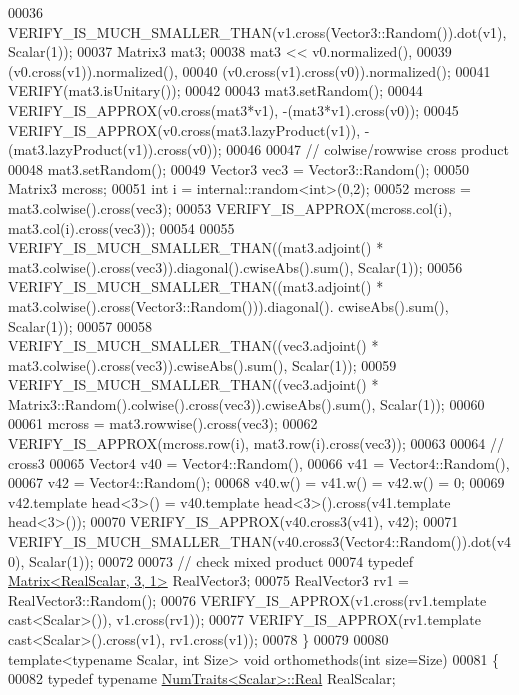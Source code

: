 \begin{DoxyCode}
00036   VERIFY\_IS\_MUCH\_SMALLER\_THAN(v1.cross(Vector3::Random()).dot(v1), Scalar(1));
00037   Matrix3 mat3;
00038   mat3 << v0.normalized(),
00039          (v0.cross(v1)).normalized(),
00040          (v0.cross(v1).cross(v0)).normalized();
00041   VERIFY(mat3.isUnitary());
00042   
00043   mat3.setRandom();
00044   VERIFY\_IS\_APPROX(v0.cross(mat3*v1), -(mat3*v1).cross(v0));
00045   VERIFY\_IS\_APPROX(v0.cross(mat3.lazyProduct(v1)), -(mat3.lazyProduct(v1)).cross(v0));
00046 
00047   \textcolor{comment}{// colwise/rowwise cross product}
00048   mat3.setRandom();
00049   Vector3 vec3 = Vector3::Random();
00050   Matrix3 mcross;
00051   \textcolor{keywordtype}{int} i = internal::random<int>(0,2);
00052   mcross = mat3.colwise().cross(vec3);
00053   VERIFY\_IS\_APPROX(mcross.col(i), mat3.col(i).cross(vec3));
00054   
00055   VERIFY\_IS\_MUCH\_SMALLER\_THAN((mat3.adjoint() * mat3.colwise().cross(vec3)).diagonal().cwiseAbs().sum(), 
      Scalar(1));
00056   VERIFY\_IS\_MUCH\_SMALLER\_THAN((mat3.adjoint() * mat3.colwise().cross(Vector3::Random())).diagonal().
      cwiseAbs().sum(), Scalar(1));
00057   
00058   VERIFY\_IS\_MUCH\_SMALLER\_THAN((vec3.adjoint() * mat3.colwise().cross(vec3)).cwiseAbs().sum(), Scalar(1));
00059   VERIFY\_IS\_MUCH\_SMALLER\_THAN((vec3.adjoint() * Matrix3::Random().colwise().cross(vec3)).cwiseAbs().sum(), 
      Scalar(1));
00060   
00061   mcross = mat3.rowwise().cross(vec3);
00062   VERIFY\_IS\_APPROX(mcross.row(i), mat3.row(i).cross(vec3));
00063 
00064   \textcolor{comment}{// cross3}
00065   Vector4 v40 = Vector4::Random(),
00066           v41 = Vector4::Random(),
00067           v42 = Vector4::Random();
00068   v40.w() = v41.w() = v42.w() = 0;
00069   v42.template head<3>() = v40.template head<3>().cross(v41.template head<3>());
00070   VERIFY\_IS\_APPROX(v40.cross3(v41), v42);
00071   VERIFY\_IS\_MUCH\_SMALLER\_THAN(v40.cross3(Vector4::Random()).dot(v40), Scalar(1));
00072   
00073   \textcolor{comment}{// check mixed product}
00074   \textcolor{keyword}{typedef} \hyperlink{group___core___module_class_eigen_1_1_matrix}{Matrix<RealScalar, 3, 1>} RealVector3;
00075   RealVector3 rv1 = RealVector3::Random();
00076   VERIFY\_IS\_APPROX(v1.cross(rv1.template cast<Scalar>()), v1.cross(rv1));
00077   VERIFY\_IS\_APPROX(rv1.template cast<Scalar>().cross(v1), rv1.cross(v1));
00078 \}
00079 
00080 \textcolor{keyword}{template}<\textcolor{keyword}{typename} Scalar, \textcolor{keywordtype}{int} Size> \textcolor{keywordtype}{void} orthomethods(\textcolor{keywordtype}{int} size=Size)
00081 \{
00082   \textcolor{keyword}{typedef} \textcolor{keyword}{typename} \hyperlink{group___core___module_struct_eigen_1_1_num_traits}{NumTraits<Scalar>::Real} RealScalar;

\end{DoxyCode}
